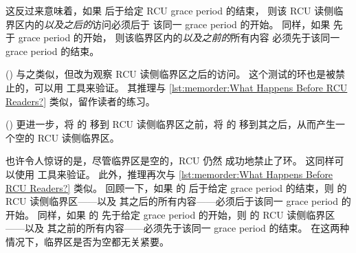 这反过来意味着，如果  后于给定 RCU grace period 的结束，
则该 RCU 读侧临界区内的\emph{以及之后的}访问必须后于
该同一 grace period 的开始。
同样，如果  先于 grace period 的开始，
则该临界区内的\emph{以及之前的}所有内容
必须先于该同一 grace period 的结束。

\begin{listing}

\caption{RCU读者之后发生了什么？}
\label{lst:memorder:What Happens After RCU Readers?}
\end{listing}

()
与之类似，但改为观察 RCU 读侧临界区之后的访问。
这个测试的环也是被禁止的，可以用 
工具来验证。
其推理与 \cref{lst:memorder:What Happens Before RCU Readers?}
类似，留作读者的练习。

\begin{listing}

\caption{空的RCU读者会怎样？}
\label{lst:memorder:What Happens With Empty RCU Readers?}
\end{listing}

()
更进一步，将  的 
移到 RCU 读侧临界区之前，将  的 
移到其之后，从而产生一个空的 RCU 读侧临界区。

也许令人惊讶的是，尽管临界区是空的，RCU 仍然
成功地禁止了环。
这同样可以使用  工具来验证。
此外，推理再次与 \cref{lst:memorder:What Happens Before RCU Readers?}
类似。
回顾一下，如果  的  后于给定 grace period
的结束，则  的 RCU 读侧临界区——以及
其之后的所有内容——必须后于该同一 grace period 的开始。
同样，如果  的  先于给定 grace period
的开始，则  的 RCU 读侧临界区——以及
其之前的所有内容——必须先于该同一 grace period 的结束。
在这两种情况下，临界区是否为空都无关紧要。

\QuickQuizEnd

